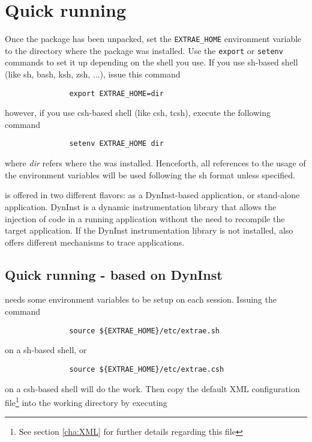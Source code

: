 \section{Quick running}

Once the package has been unpacked, set the {\tt EXTRAE\_HOME} environment variable to the directory where the package was installed. Use the {\tt export} or {\tt setenv} commands to set it up depending on the shell you use.  If you use sh-based shell (like sh, bash, ksh, zsh, ...), issue this command
\begin{verbatim}
               export EXTRAE_HOME=dir
\end{verbatim}
however, if you use csh-based shell (like csh, tcsh), execute the following command
\begin{verbatim}
               setenv EXTRAE_HOME dir
\end{verbatim}
where {\em dir} refers where the \TRACE was installed. Henceforth, all references to the usage of the environment variables will be used following the sh format unless specified.

\TRACE is offered in two different flavors: as a DynInst-based application, or stand-alone application. DynInst is a dynamic instrumentation library that allows the injection of code in a running application without the need to recompile the target application. If the DynInst instrumentation library is not installed, \TRACE also offers different mechanisms to trace applications.

\subsection{Quick running \TRACE - based on DynInst}\label{subsec:RunningTraceDynInst}

\TRACE needs some environment variables to be setup on each session. Issuing the command 

\begin{verbatim}
               source ${EXTRAE_HOME}/etc/extrae.sh
\end{verbatim}

on a sh-based shell, or 

\begin{verbatim}
               source ${EXTRAE_HOME}/etc/extrae.csh
\end{verbatim}

on a csh-based shell will do the work. Then copy the default XML configuration file\footnote{See section \ref{cha:XML} for further details regarding this file} into the working directory by executing

